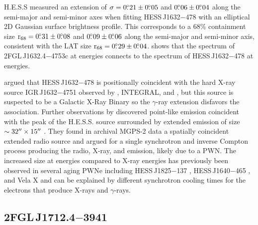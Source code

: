H.E.S.S measured an extension of $\sigma=0\mbox{$.\!\!^\circ$}21\pm0\mbox{$.\!\!^\circ$}05$ and
$0\mbox{$.\!\!^\circ$}06\pm0\mbox{$.\!\!^\circ$}04$ along the semi-major and semi-minor axes when
fitting HESS\,J1632$-$478 with an elliptical 2D Gaussian surface
brightness profile.  This corresponds to a 68\% containment size
${\mathrm{r}_{68}}=0\mbox{$.\!\!^\circ$}31\pm0\mbox{$.\!\!^\circ$}08$ and $0\mbox{$.\!\!^\circ$}09\pm0\mbox{$.\!\!^\circ$}06$ along
the semi-major and semi-minor axis, consistent with the LAT size
${\mathrm{r}_{68}}=0\mbox{$.\!\!^\circ$}29\pm0\mbox{$.\!\!^\circ$}04$.   shows that
the spectrum of 2FGL\,J1632.4$-$4753c at \gev energies connects to the
spectrum of HESS\,J1632$-$478 at \tev energies.

\cite{aharonian_2006_h.e.s.s.-survey} argued that HESS\,J1632$-$478
is positionally coincident with the hard X-ray source
IGR\,J1632$-$4751 observed by \asca, INTEGRAL, and \xmmnewton
\citep{sugizaki_2001a_faint-x-ray,tomsick_2003a_j16320-4751,rodriguez_2003a_xmm-newton-observation},
but this source is suspected to be a Galactic X-Ray Binary so the
$\gamma$-ray extension disfavors the association.  Further observations
by \xmmnewton discovered point-like emission coincident with the peak
of the H.E.S.S. source surrounded by extended emission of size
$\sim32\mbox{$^{\prime\prime}$}\times15\mbox{$^{\prime\prime}$}$ \citep{balbo_2010a_j1632-478:-energetic}.
They found in archival MGPS-2 data a spatially coincident extended
radio source \citep{murphy_2007a_second-epoch} and argued for a single
synchrotron and inverse Compton process producing the radio, X-ray, and \tev emission,
likely due to a PWN.  The increased size at \tev energies compared
to X-ray energies has previously been observed in several aging PWNe
including HESS\,J1825$-$137 \citep{gaensler_2003a_xmm-newton-observations,aharonian_2006_energy-dependent},
HESS\,J1640$-$465 \citep{aharonian_2006_h.e.s.s.-survey,funk_2007a_xmm-newton-observations},
and Vela X \citep{markwardt_1995a_x-ray-pulsar,aharonian_2006a_first-detection} and can be explained by
different synchrotron cooling times for the electrons that produce X-rays
and $\gamma$-rays.


\subsection{2FGL\,J1712.4$-$3941}

